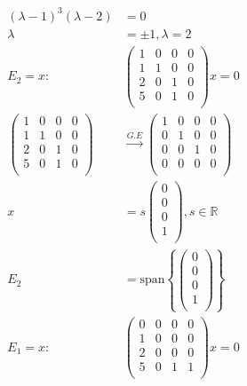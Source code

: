 \documentclass[12pt]{article}
\newenvironment{problem}[2][Problem]{\begin{trivlist}
\item[\hskip \labelsep {\bfseries #1}\hskip \labelsep {\bfseries #2.}]}{\end{trivlist}}
\begin{document}
\begin{problem}{1.b}
\end{problem}
\begin{align*}
(\lambda - 1)^3(\lambda - 2) &= 0\\
\lambda &= \pm 1, \lambda = 2 \\
E_2 = x :
&\left( \begin{array}{cccc}
1 & 0 & 0 & 0\\
1 & 1 & 0 & 0\\
2 & 0 & 1 & 0\\
5 & 0 & 1 & 0\\
\end{array} \right) x = 0 \\
\left( \begin{array}{cccc}
1 & 0 & 0 & 0\\
1 & 1 & 0 & 0\\
2 & 0 & 1 & 0\\
5 & 0 & 1 & 0\\
\end{array} \right)
&\xrightarrow{G.E}
\left( \begin{array}{cccc}
1 & 0 & 0 & 0\\
0 & 1 & 0 & 0\\
0 & 0 & 1 & 0\\
0 & 0 & 0 & 0\\
\end{array} \right)\\
x &= 
s\left( \begin{array}{c}
0\\
0\\
0\\
1\\
\end{array} \right) , s \in \mathbb{R}\\
E_2 &= \text{span}\left\{
\left( \begin{array}{c}
0\\
0\\
0\\
1\\
\end{array} \right) \right\} \\
E_{1} = x :
&\left( \begin{array}{cccc}
0 & 0 & 0 & 0\\
1 & 0 & 0 & 0\\
2 & 0 & 0 & 0\\
5 & 0 & 1 & 1\\
\end{array} \right) x = 0 \\

\end{align*}
\end{document}
